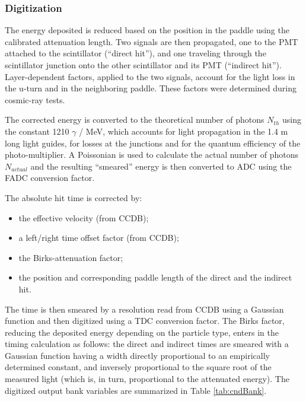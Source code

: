 \subsubsection{Digitization}

The energy deposited is reduced based on the position in the paddle using the calibrated attenuation length.
Two signals are then propagated, one to the PMT attached to the scintillator (``direct hit''), and one traveling through the scintillator junction
onto the other scintillator and its PMT (``indirect hit'').
Layer-dependent factors, applied to the two  signals, account for the light loss in the u-turn and in the neighboring paddle.
These factors were determined during cosmic-ray tests.

The corrected energy is converted to the theoretical number of photons $N_{th}$ using the constant 1210 $\gamma$ / MeV,
which accounts for light propagation in the 1.4 m long light guides, for losses at the junctions and for the
quantum efficiency of the photo-multiplier.
A Poissonian is used to calculate the actual number of photons $N_{actual}$ and the resulting ``smeared'' energy
is then converted to ADC using the FADC conversion factor.

The absolute hit time is corrected by:

\begin{itemize}
	\item the effective velocity (from CCDB);
	\item a left/right time offset factor (from CCDB);
	\item the Birks-attenuation factor;
	\item the position and corresponding paddle length of the direct and the indirect hit.
\end{itemize}

The time is then smeared by a resolution read from CCDB using a Gaussian function and then digitized using a TDC conversion factor.
The Birks factor, reducing the deposited
energy depending on the particle type, enters in the timing calculation as
follows: the direct and indirect times are smeared with a Gaussian
function having a width directly proportional to an empirically determined
constant, and inversely proportional to the square root of the measured
light (which is, in turn, proportional to the attenuated energy).
The digitized output bank variables are summarized in Table \ref{tab:cndBank}.

